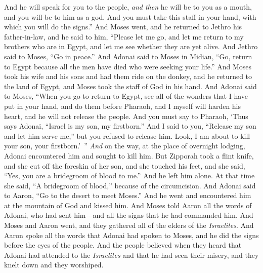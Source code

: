 \begin{biblechapter}
\verse And he will speak for you to the people, \textit{and then} he will be to you as a mouth, and you will be to him as a god.
\verse And you must take this staff in your hand, with which you will do the signs.”
 And Moses went, and he returned to Jethro his father-in-law, and he said to him, “Please let me go, and let me return to my brothers who are in Egypt, and let me see whether they are yet alive. And Jethro said to Moses, “Go in peace.”
\verse And Adonai said to Moses in Midian, “Go, return to Egypt because all the men have died who were seeking your life.”
\verse And Moses took his wife and his sons and had them ride on the donkey, and he returned to the land of Egypt, and Moses took the staff of God in his hand.
\verse And Adonai said to Moses, “When you go to return to Egypt, see all of the wonders that I have put in your hand, and do them before Pharaoh, and I myself will harden his heart, and he will not release the people.
\verse And you must say to Pharaoh, ‘Thus says Adonai, “Israel is my son, my firstborn.”
\verse And I said to you, “Release my son and let him serve me,” but you refused to release him. Look, I am about to kill your son, your firstborn.’ ”
\verse \textit{And} on the way, at the place of overnight lodging, Adonai encountered him and sought to kill him.
\verse But Zipporah took a flint knife, and she cut off the foreskin of her son, and she touched his feet, and she said, “Yes, you are a bridegroom of blood to me.”
\verse And he left him alone. At that time she said, “A bridegroom of blood,” because of the circumcision.
\verse And Adonai said to Aaron, “Go to the desert to meet Moses.” And he went and encountered him at the mountain of God and kissed him.
\verse And Moses told Aaron all the words of Adonai, who had sent him—and all the signs that he had commanded him.
\verse And Moses and Aaron went, and they gathered all of the elders of the \textit{Israelites}.
\verse And Aaron spoke all the words that Adonai had spoken to Moses, and he did the signs before the eyes of the people.
\verse And the people believed when they heard that Adonai had attended to the \textit{Israelites} and that he had seen their misery, and they knelt down and they worshiped.
\end{biblechapter}

